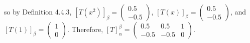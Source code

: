 \documentclass[12pt]{article}
\newenvironment{problem}[2][Problem]
{
	\begin{trivlist} 
		\item[\hskip \labelsep {\bfseries #1 #2:}]
	}
{
	\end{trivlist}
	}
\newenvironment{solution}[1][Solution]
{
	\begin{trivlist} 
		\item[\hskip \labelsep {\itshape #1:}]
	}
	{
	\end{trivlist}
}
\begin{document}
\begin{problem}{1}
\begin{solution}
so by Definition 4.4.3,
$[T(x^2)]_\beta = \begin{pmatrix}0.5\\-0.5 \end{pmatrix}$, 
$[T(x)]_\beta=\begin{pmatrix} 0.5\\-0.5 \end{pmatrix}$, and
$[T(1)]_\beta=\begin{pmatrix}1\\0 \end{pmatrix}$.
Therefore,
$[T]_\alpha ^{\beta}= \begin{pmatrix} 0.5&0.5&1\\-0.5&-0.5&0 \end{pmatrix}$.

\end{solution}

\end{problem}
\end{document}
